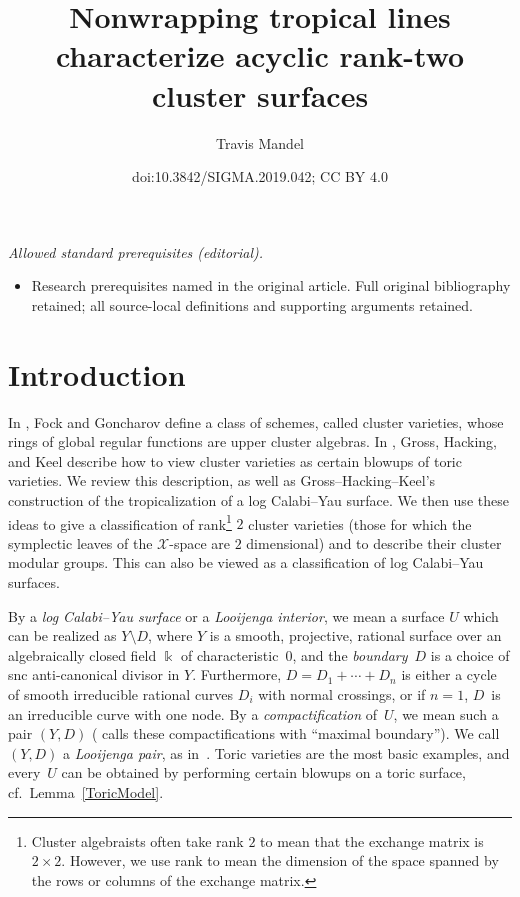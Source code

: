 \documentclass[10pt,a4paper]{amsart}
\title{Nonwrapping tropical lines characterize acyclic rank-two cluster surfaces}
\author{Travis Mandel}
\date{doi:10.3842/SIGMA.2019.042; CC BY 4.0}
\numberwithin{equation}{section}
\numberwithin{figure}{section}
\numberwithin{table}{section}
\let\s=\mathcal
\newcommand {\kk} {\Bbbk}
\theoremstyle{definition}
\begin{document}
\maketitle
\noindent\textit{Allowed standard prerequisites (editorial).}\begin{itemize}
\item Research prerequisites named in the original article. Full original bibliography retained; all source-local definitions and supporting arguments retained.
\end{itemize}\medskip
\section{Introduction}\label{Introduction}

In \cite{FG1}, Fock and Goncharov define a class of schemes, called cluster varieties, whose rings of global regular functions are upper cluster algebras. In \cite{GHK3}, Gross, Hacking, and Keel describe how to view cluster varieties as certain blowups of toric varieties. We review this description, as well as Gross--Hacking--Keel's construction \cite{GHK1} of the tropicalization of a log Calabi--Yau surface. We then use these ideas to give a classification of rank\footnote{Cluster algebraists often take rank $2$ to mean that the exchange matrix is $2\times 2$. However, we use rank to mean the dimension of the space spanned by the rows or columns of the exchange matrix.} $2$ cluster varieties (those for which the symplectic leaves of the $\s{X}$-space are $2$ dimensional) and to describe their cluster modular groups. This can also be viewed as a classification of log Calabi--Yau surfaces.

By a {\it log Calabi--Yau surface} or a {\it Looijenga interior}, we mean a surface $U$ which can be realized as $Y\setminus D$, where $Y$ is a smooth, projective, rational surface over an algebraically closed field $\kk$ of characteristic~$0$, and the {\it boundary}~$D$ is a choice of snc anti-canonical divisor in $Y$. Furthermore, $D=D_1+\cdots + D_n$ is either a cycle of smooth irreducible rational curves $D_i$ with normal crossings, or if $n=1$, $D$~is an irreducible curve with one node. By a {\it compactification} of~$U$, we mean such a pair $(Y,D)$ (\cite{GHK2} calls these compactifications with ``maximal boundary''). We call $(Y,D)$ a {\it Looijenga pair}, as in~\cite{GHK1}. Toric varieties are the most basic examples, and every~$U$ can be obtained by performing certain blowups on a toric surface, cf.\ Lemma~\ref{ToricModel}.
\end{document}
